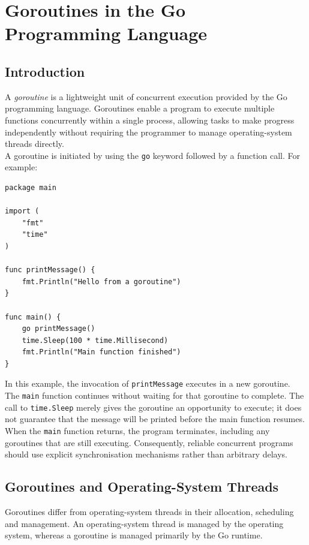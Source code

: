 \section{Goroutines in the Go Programming Language}

\subsection{Introduction}

A \textit{goroutine} is a lightweight unit of concurrent execution provided by the Go programming language. Goroutines enable a program to execute multiple functions concurrently within a single process, allowing tasks to make progress independently without requiring the programmer to manage operating-system threads directly.\\

A goroutine is initiated by using the \texttt{go} keyword followed by a function call. For example:

\begin{lstlisting}
package main

import (
    "fmt"
    "time"
)

func printMessage() {
    fmt.Println("Hello from a goroutine")
}

func main() {
    go printMessage()
    time.Sleep(100 * time.Millisecond)
    fmt.Println("Main function finished")
}
\end{lstlisting}

In this example, the invocation of \texttt{printMessage} executes in a new goroutine. The \texttt{main} function continues without waiting for that goroutine to complete. The call to \texttt{time.Sleep} merely gives the goroutine an opportunity to execute; it does not guarantee that the message will be printed before the main function resumes.\\

When the \texttt{main} function returns, the program terminates, including any goroutines that are still executing. Consequently, reliable concurrent programs should use explicit synchronisation mechanisms rather than arbitrary delays.

\subsection{Goroutines and Operating-System Threads}

Goroutines differ from operating-system threads in their allocation, scheduling and management. An operating-system thread is managed by the operating system, whereas a goroutine is managed primarily by the Go runtime.\\

